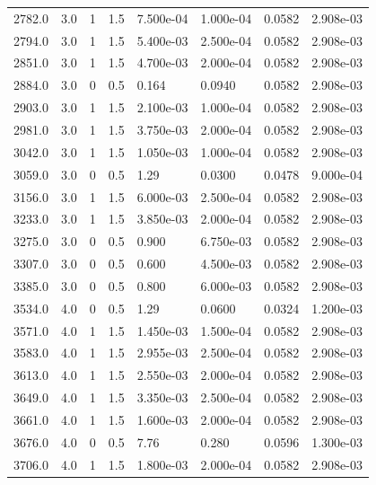 \documentclass[preview]{standalone}
\begin{document}
{{\begin{tabular}{L{1.2cm}C{1.2cm} C{0.3cm}C{0.5cm} C{1.4cm}C{1.4cm} C{1.4cm}C{1.4cm}}
  2782.0  &   3.0  & 1     & 1.5 &  7.500e-04  & 1.000e-04  & 0.0582 &  2.908e-03   \\ 
  2794.0  &   3.0  & 1     & 1.5 &  5.400e-03  & 2.500e-04  & 0.0582 &  2.908e-03   \\ 
  2851.0  &   3.0  & 1     & 1.5 &  4.700e-03  & 2.000e-04  & 0.0582 &  2.908e-03   \\ 
  2884.0  &   3.0  & 0     & 0.5 &  0.164  & 0.0940  & 0.0582 &  2.908e-03   \\ 
  2903.0  &   3.0  & 1     & 1.5 &  2.100e-03  & 1.000e-04  & 0.0582 &  2.908e-03   \\ 
  2981.0  &   3.0  & 1     & 1.5 &  3.750e-03  & 2.000e-04  & 0.0582 &  2.908e-03   \\ 
  3042.0  &   3.0  & 1     & 1.5 &  1.050e-03  & 1.000e-04  & 0.0582 &  2.908e-03   \\ 
  3059.0  &   3.0  & 0     & 0.5 &  1.29  & 0.0300  & 0.0478 &  9.000e-04   \\ 
  3156.0  &   3.0  & 1     & 1.5 &  6.000e-03  & 2.500e-04  & 0.0582 &  2.908e-03   \\ 
  3233.0  &   3.0  & 1     & 1.5 &  3.850e-03  & 2.000e-04  & 0.0582 &  2.908e-03   \\ 
  3275.0  &   3.0  & 0     & 0.5 &  0.900  & 6.750e-03  & 0.0582 &  2.908e-03   \\ 
  3307.0  &   3.0  & 0     & 0.5 &  0.600  & 4.500e-03  & 0.0582 &  2.908e-03   \\ 
  3385.0  &   3.0  & 0     & 0.5 &  0.800  & 6.000e-03  & 0.0582 &  2.908e-03   \\ 
  3534.0  &   4.0  & 0     & 0.5 &  1.29  & 0.0600  & 0.0324 &  1.200e-03   \\ 
  3571.0  &   4.0  & 1     & 1.5 &  1.450e-03  & 1.500e-04  & 0.0582 &  2.908e-03   \\ 
  3583.0  &   4.0  & 1     & 1.5 &  2.955e-03  & 2.500e-04  & 0.0582 &  2.908e-03   \\ 
  3613.0  &   4.0  & 1     & 1.5 &  2.550e-03  & 2.000e-04  & 0.0582 &  2.908e-03   \\ 
  3649.0  &   4.0  & 1     & 1.5 &  3.350e-03  & 2.500e-04  & 0.0582 &  2.908e-03   \\ 
  3661.0  &   4.0  & 1     & 1.5 &  1.600e-03  & 2.000e-04  & 0.0582 &  2.908e-03   \\ 
  3676.0  &   4.0  & 0     & 0.5 &  7.76  & 0.280  & 0.0596 &  1.300e-03   \\ 
  3706.0  &   4.0  & 1     & 1.5 &  1.800e-03  & 2.000e-04  & 0.0582 &  2.908e-03   \\ 

\end{tabular}}}
\end{document}
